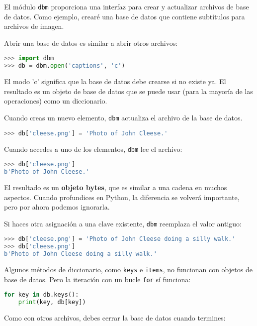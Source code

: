 El módulo \texttt{dbm} proporciona una interfaz para crear y actualizar archivos de base de datos. Como ejemplo, crearé una base de datos que contiene subtítulos para archivos de imagen.

Abrir una base de datos es similar a abrir otros archivos:

\begin{lstlisting}[language=Python]
>>> import dbm
>>> db = dbm.open('captions', 'c')
\end{lstlisting}

El modo 'c' significa que la base de datos debe crearse si no existe ya. El resultado es un objeto de base de datos que se puede usar (para la mayoría de las operaciones) como un diccionario.

Cuando creas un nuevo elemento, \texttt{dbm} actualiza el archivo de la base de datos.

\begin{lstlisting}[language=Python]
>>> db['cleese.png'] = 'Photo of John Cleese.'
\end{lstlisting}

Cuando accedes a uno de los elementos, \texttt{dbm} lee el archivo:

\begin{lstlisting}[language=Python]
>>> db['cleese.png']
b'Photo of John Cleese.'
\end{lstlisting}

El resultado es un \textbf{objeto bytes}, que es similar a una cadena en muchos aspectos. Cuando profundices en Python, la diferencia se volverá importante, pero por ahora podemos ignorarla.

Si haces otra asignación a una clave existente, \texttt{dbm} reemplaza el valor antiguo:

\begin{lstlisting}[language=Python]
>>> db['cleese.png'] = 'Photo of John Cleese doing a silly walk.'
>>> db['cleese.png']
b'Photo of John Cleese doing a silly walk.'
\end{lstlisting}

Algunos métodos de diccionario, como \texttt{keys} e \texttt{items}, no funcionan con objetos de base de datos. Pero la iteración con un bucle \texttt{for} sí funciona:

\begin{lstlisting}[language=Python]
for key in db.keys():
    print(key, db[key])
\end{lstlisting}

Como con otros archivos, debes cerrar la base de datos cuando termines:

